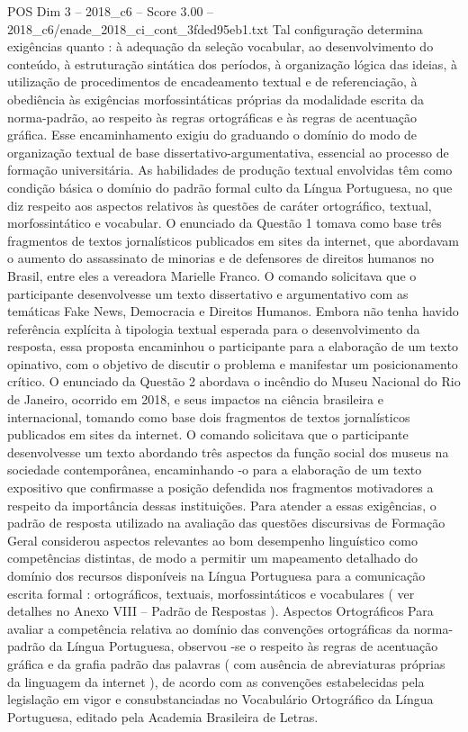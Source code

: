 \begin{textsample}{POS Dim 3 – 2018\_c6 – Score 3.00 – 2018\_c6/enade\_2018\_ci\_cont\_3fded95eb1.txt}
Tal configuração determina exigências quanto : à adequação da seleção vocabular, ao desenvolvimento do conteúdo, à estruturação sintática dos períodos, à organização lógica das ideias, à utilização de procedimentos de encadeamento textual e de referenciação, à obediência às exigências morfossintáticas próprias da modalidade escrita da norma-padrão, ao respeito às regras ortográficas e às regras de acentuação gráfica.
Esse encaminhamento exigiu do graduando o domínio do modo de organização textual de base dissertativo-argumentativa, essencial ao processo de formação universitária.
As habilidades de produção textual envolvidas têm como condição básica o domínio do padrão formal culto da Língua Portuguesa, no que diz respeito aos aspectos relativos às questões de caráter ortográfico, textual, morfossintático e vocabular.
O enunciado da Questão 1 tomava como base três fragmentos de textos jornalísticos publicados em sites da internet, que abordavam o aumento do assassinato de minorias e de defensores de direitos humanos no Brasil, entre eles a vereadora Marielle Franco.
O comando solicitava que o participante desenvolvesse um texto dissertativo e argumentativo com as temáticas Fake News, Democracia e Direitos Humanos.
Embora não tenha havido referência explícita à tipologia textual esperada para o desenvolvimento da resposta, essa proposta encaminhou o participante para a elaboração de um texto opinativo, com o objetivo de discutir o problema e manifestar um posicionamento crítico.
O enunciado da Questão 2 abordava o incêndio do Museu Nacional do Rio de Janeiro, ocorrido em 2018, e seus impactos na ciência brasileira e internacional, tomando como base dois fragmentos de textos jornalísticos publicados em sites da internet.
O comando solicitava que o participante desenvolvesse um texto abordando três aspectos da função social dos museus na sociedade contemporânea, encaminhando -o para a elaboração de um texto expositivo que confirmasse a posição defendida nos fragmentos motivadores a respeito da importância dessas instituições.
Para atender a essas exigências, o padrão de resposta utilizado na avaliação das questões discursivas de Formação Geral considerou aspectos relevantes ao bom desempenho linguístico como competências distintas, de modo a permitir um mapeamento detalhado do domínio dos recursos disponíveis na Língua Portuguesa para a comunicação escrita formal : ortográficos, textuais, morfossintáticos e vocabulares ( ver detalhes no Anexo VIII – Padrão de Respostas ).
Aspectos Ortográficos Para avaliar a competência relativa ao domínio das convenções ortográficas da norma-padrão da Língua Portuguesa, observou -se o respeito às regras de acentuação gráfica e da grafia padrão das palavras ( com ausência de abreviaturas próprias da linguagem da internet ), de acordo com as convenções estabelecidas pela legislação em vigor e consubstanciadas no Vocabulário Ortográfico da Língua Portuguesa, editado pela Academia Brasileira de Letras.

\end{textsample}
